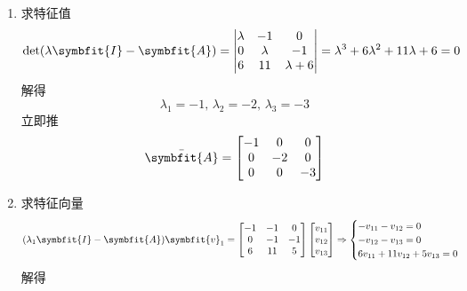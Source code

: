 \begin{exercise} %
    \begin{enumerate}
        \item 求特征值
        \begin{equation*}
            \det(\lambda \symbfit{I} - \symbfit{A}) = \begin{vmatrix}
                \lambda & -1 & 0 \\
                0 & \lambda & -1 \\
                6 & 11 & \lambda+6 
            \end{vmatrix} = \lambda^3 + 6\lambda^2 + 11\lambda + 6 = 0
        \end{equation*}
        解得
        \begin{equation*}
            \lambda_1 = -1,\,\lambda_2 = -2,\,\lambda_3 = -3
        \end{equation*}
        立即推
        \begin{equation*}
            \bar{\symbfit{A}} = \begin{bmatrix}
                -1 & 0 & 0 \\
                0 & -2 & 0 \\
                0 & 0 & -3
            \end{bmatrix}
        \end{equation*}
        \item 求特征向量
        \begin{equation*}
            (\lambda_1 \symbfit{I} - \symbfit{A}) \symbfit{v}_1 = \begin{bmatrix}
                -1 & -1 & 0 \\
                0 & -1 & -1 \\
                6 & 11 & 5
            \end{bmatrix} \begin{bmatrix}
                v_{11} \\
                v_{12} \\
                v_{13}
            \end{bmatrix} \Rightarrow \begin{cases}
                -v_{11} - v_{12} = 0 \\
                -v_{12} - v_{13} = 0 \\
                6v_{11} + 11v_{12} + 5v_{13} = 0
            \end{cases}
        \end{equation*}
        解得
        \begin{equation*}

\end{equation*}
\end{enumerate}
\end{exercise}
